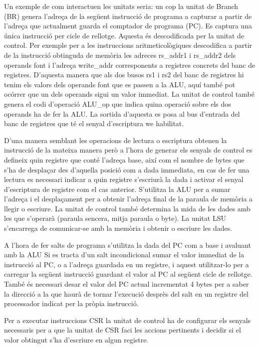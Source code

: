 \documentclass[10pt,a4paper,twocolumn,twoside]{article}
\begin{document}
    Un exemple de com interactuen les unitats seria: un cop la unitat de Branch (BR) genera l’adreça de la següent instrucció de programa a capturar a partir de l'adreça que actualment guarda el comptador de programa (PC). 
    Es captura una única instrucció per cicle de rellotge. Aquesta és descodificada per la unitat de control. 
    Per exemple per a les instruccions aritmeticològiques descodifica a partir de la instrucció obtinguda de memòria les adreces rs\_addr1 i rs\_addr2 dels operands font i l’adreça write\_addr corresponents a registres concrets del banc de registres. 
    D’aquesta manera que als dos busos rs1 i rs2 del banc de registres hi tenim els valors dels operands font que es passen a la ALU, aquí també pot ocórrer que un dels operands sigui un valor immediat. La unitat de control també genera el codi d’operació ALU\_op que indica quina operació sobre els dos operands ha de fer la ALU. 
    La sortida d’aquesta es posa al bus d’entrada del banc de registres que té el senyal d’escriptura we habilitat. 
    
    D'una manera semblant les operacions de lectura o escriptura obtenen la instrucció de la mateixa manera però a l'hora de generar els senyals de control es defineix quin registre que conté l'adreça base, així com el nombre de bytes que s'ha de desplaçar des d'aquella posició com a dada immediata, en cas de fer una lectura es necessari indicar a quin registre s'escriurà la dada i activar el senyal d'escriptura de registre com el cas anterior. S'utilitza la ALU per a sumar l'adreça i el desplaçament per a obtenir l'adreça final de la paraula de memòria a llegir o escriure. La unitat de control també determina la mida de les dades amb les que s'operarà (paraula sencera, mitja paraula o byte). La unitat LSU s'encarrega de comunicar-se amb la memòria i obtenir o escriure les dades.
    
    A l'hora de fer salts de programa s'utilitza la dada del PC com a base i avaluant amb la ALU Si es tracta d'un salt incondicional sumar el valor immediat de la instrucció al PC, o a l'adreça guardada en un registre, i aquest utilitzar-lo per a carregar la següent instrucció guardant el valor al PC al següent cicle de rellotge. També és necessari desar el valor del PC actual incrementat 4 bytes per a saber la direcció a la que haurà de tornar l'execució desprès del salt en un registre del processador indicat per la pròpia instrucció.
    
    Per a executar instruccions CSR la unitat de control ha de configurar els senyals necessaris per a que la unitat de CSR faci les accions pertinents i decidir si el valor obtingut s'ha d'escriure en algun registre.
    
\end{document}
